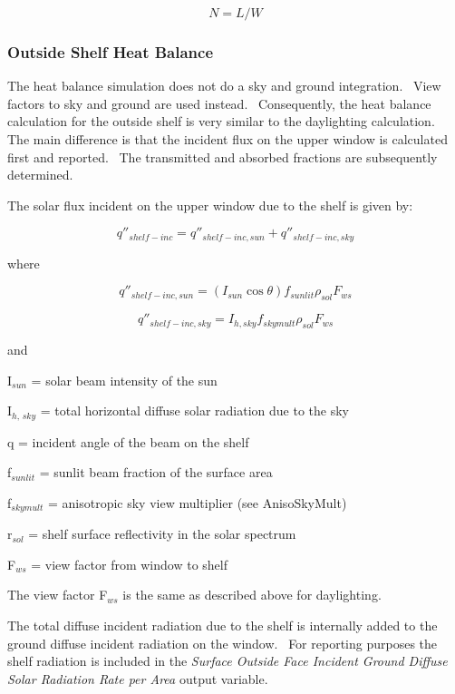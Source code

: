 \begin{equation}
N = L/W
\end{equation}

\subsubsection{Outside Shelf Heat Balance}\label{outside-shelf-heat-balance}

The heat balance simulation does not do a sky and ground integration.~ View factors to sky and ground are used instead.~ Consequently, the heat balance calculation for the outside shelf is very similar to the daylighting calculation.~ The main difference is that the incident flux on the upper window is calculated first and reported.~ The transmitted and absorbed fractions are subsequently determined.

The solar flux incident on the upper window due to the shelf is given by:

\begin{equation}
{q''_{shelf - inc}} = {q''_{shelf - inc,sun}} + {q''_{shelf - inc,sky}}
\end{equation}

where

\begin{equation}
{q''_{shelf - inc,sun}} = \left( {{I_{sun}}\cos \theta } \right){f_{sunlit}}{\rho_{sol}}{F_{ws}}
\end{equation}

\begin{equation}
{q''_{shelf - inc,sky}} = {I_{h,sky}}{f_{skymult}}{\rho_{sol}}{F_{ws}}
\end{equation}

and

I\(_{sun}\) = solar beam intensity of the sun

I\(_{h,\, sky}\) = total horizontal diffuse solar radiation due to the sky

q = incident angle of the beam on the shelf

f\(_{sunlit}\) = sunlit beam fraction of the surface area

f\(_{skymult}\) = anisotropic sky view multiplier (see AnisoSkyMult)

r\(_{sol}\) = shelf surface reflectivity in the solar spectrum

F\(_{ws}\) = view factor from window to shelf

The view factor F\(_{ws}\) is the same as described above for daylighting.

The total diffuse incident radiation due to the shelf is internally added to the ground diffuse incident radiation on the window.~ For reporting purposes the shelf radiation is included in the \emph{Surface Outside Face Incident Ground Diffuse Solar Radiation Rate per Area} output variable.

